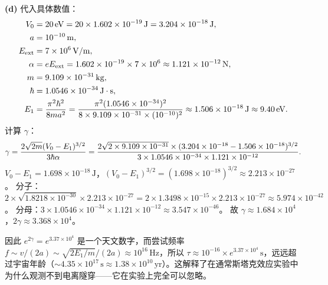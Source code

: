 \begin{solution}
\textbf{(d)} 代入具体数值：
\begin{align*}
V_0 &= 20\,\mathrm{eV}=20\times1.602\times10^{-19}\,\mathrm{J}=3.204\times10^{-18}\,\mathrm{J},\\
a &= 10^{-10}\,\mathrm{m},\\
E_{\rm ext} &= 7\times10^6\,\mathrm{V/m},\\
\alpha &= eE_{\rm ext}=1.602\times10^{-19}\times7\times10^6\approx1.121\times10^{-12}\,\mathrm{N},\\
m &= 9.109\times10^{-31}\,\mathrm{kg},\\
\hbar &= 1.0546\times10^{-34}\,\mathrm{J\cdot s},\\
E_1 &= {\pi^2\hbar^2\over8ma^2}
={\pi^2(1.0546\times10^{-34})^2\over8\times9.109\times10^{-31}\times(10^{-10})^2}
\approx 1.506\times10^{-18}\,\mathrm{J}\approx 9.40\,\mathrm{eV}.
\end{align*}
计算 $\gamma$：
\[
\gamma={2\sqrt{2m}(V_0-E_1)^{3/2}\over3\hbar\alpha}
={2\sqrt{2\times9.109\times10^{-31}}\times(3.204\times10^{-18}-1.506\times10^{-18})^{3/2}
\over3\times1.0546\times10^{-34}\times1.121\times10^{-12}}.
\]
$V_0-E_1=1.698\times10^{-18}\,\mathrm{J}$，$(V_0-E_1)^{3/2}=(1.698\times10^{-18})^{3/2}\approx2.213\times10^{-27}$。
分子：$2\times\sqrt{1.8218\times10^{-30}}\times2.213\times10^{-27}
=2\times1.3498\times10^{-15}\times2.213\times10^{-27}\approx5.974\times10^{-42}$。
分母：$3\times1.0546\times10^{-34}\times1.121\times10^{-12}\approx3.547\times10^{-46}$。
故 $\gamma\approx1.684\times10^4$，$2\gamma\approx3.368\times10^4$。

因此 $e^{2\gamma}=e^{3.37\times10^4}$ 是一个天文数字，而尝试频率 $f\sim v/(2a)\sim\sqrt{2E_1/m}/(2a)\approx 10^{16}\,\mathrm{Hz}$，所以 $\tau\approx 10^{-16}\times e^{3.37\times10^4}\,\mathrm{s}$，远远超过宇宙年龄（$\sim4.35\times10^{17}\,\mathrm{s}\approx1.38\times10^{10}\,\mathrm{yr}$）。这解释了在通常斯塔克效应实验中为什么观测不到电离隧穿——它在实验上完全可以忽略。
\end{solution}

